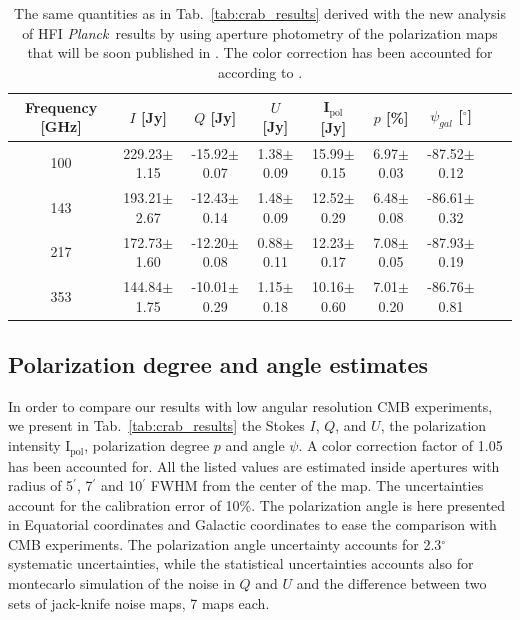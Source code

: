 \documentclass[twocolumn,traditabstract]{aa}
\def\Planck{\textit{Planck}}
\begin{document}
 \begin{table}[h!]
  \centering
      \begin{tabular}{ccccccccc}
      \hline
      \hline
       Frequency [GHz] & \small $I$ [Jy] & \small $Q$ [Jy] & \small $U$ [Jy] & \small I$_\textrm{pol}$ [Jy] & \small $p$ [\%] & \small $\psi_{gal}$ [$^\circ$] \\
      \hline

\small 100 & \small 229.23$\pm$1.15  & \small -15.92$\pm$0.07 & \small 1.38$\pm$0.09 & \small 15.99$\pm$0.15 & \small 6.97$\pm$0.03 & \small -87.52$\pm$0.12  \\ 
\small 143 & \small 193.21$\pm$2.67  & \small -12.43$\pm$0.14 & \small 1.48$\pm$0.09 & \small 12.52$\pm$0.29 & \small 6.48$\pm$0.08 & \small -86.61$\pm$0.32  \\
\small 217 & \small 172.73$\pm$1.60  & \small -12.20$\pm$0.08 & \small 0.88$\pm$0.11 & \small 12.23$\pm$0.17 & \small 
7.08$\pm$0.05 & \small -87.93$\pm$0.19  \\
\small 353 & \small 144.84$\pm$1.75  & \small -10.01$\pm$0.29 & \small 1.15$\pm$0.18 & \small 10.16$\pm$0.60 & \small 7.01$\pm$0.20 & \small -86.76$\pm$0.81 \\
    \hline            
    \hline   
    \end{tabular}
      \caption{The same quantities as in Tab.~\ref{tab:crab_results} derived with the new analysis of HFI \Planck\ results by using aperture photometry of the polarization maps that will be soon published in \cite{planck2018}. The color correction has been accounted for according to \cite{planckhfispectral}.}
    \label{tab:planck_results}
 \end{table}

\subsection{Polarization degree and angle estimates}
In order to compare our results with low angular resolution CMB experiments, we present in Tab.~\ref{tab:crab_results} the Stokes $I$, $Q$, and $U$, the polarization intensity I$_\textrm{pol}$, polarization degree $p$ and angle $\psi$. A color correction factor of 1.05 has been accounted for. All the listed values are estimated inside apertures with radius of 5$^\prime$, 7$^\prime$ and 10$^\prime$ FWHM from the center of the map. The uncertainties account for the calibration error of 10\%. 
The polarization angle is here presented in Equatorial coordinates and Galactic coordinates to ease the comparison with CMB experiments.
The polarization angle uncertainty accounts for 2.3$^{\circ}$ systematic uncertainties, while the statistical uncertainties accounts also for montecarlo simulation of the noise in $Q$ and $U$ and the difference between two sets of jack-knife noise maps, 7 maps each.
\end{document}
